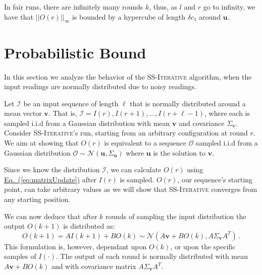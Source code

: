 \documentclass[preprint,12pt]{elsarticle}
\newcommand{\namedrefeq}[2]{\hyperref[#2]{#1~\mbox{\rm(\ref*{#2})}}}
\newcommand{\equationref}[1]{\namedrefeq{Eq.}{#1}}
\newcommand\normi[1]{\left|\left|#1\right|\right|_\infty}
\newcommand{\syncAlg}{\textsc{SS-Iterative}\xspace}
\newcommand{\uu}{\mathbf{u}}
\newcommand{\vv}{\mathbf{v}}
\newcommand{\Ir}[1]{I(#1)}
\newcommand{\Or}[1]{O(#1)}
\begin{document}
In fair runs,
there are infinitely many rounds $k$, thus, as $l$ and $r$ go to
infinity, we have that $\normi{\Or{r}}$ is bounded by a hypercube of
length $\delta  c_1$ around $\uu$.



\section{Probabilistic Bound}\label{sec:Probabilistic}
In this section we analyze the behavior of the \syncAlg algorithm, when the input readings are normally distributed
due to noisy readings. 

Let $\mathcal{I}$ be an input sequence of length $\ell$ that is normally distributed around a mean vector $\vv$. That is, $\mathcal{I} =\Ir{r}, \Ir{r+1}, \dots, \Ir{r+\ell-1}$, where each is sampled i.i.d from a Gaussian distribution with mean $\vv$ and covariance $\Sigma_{\vv}$. Consider \syncAlg's run, starting from an arbitrary configuration at round $r$. We aim at showing that $\Or{r}$ is equivalent to a sequence $\mathcal{O}$ sampled i.i.d from a Gaussian distribution $\mathcal{O} \sim \mathcal{N}(\uu, \Sigma_{\uu})$ where $\uu$ is the solution to $\vv$.

Since we know the distribution $\mathcal{I}$, we can calculate $\Or{r}$ using \equationref{eq:matrixUpdate} after $\Ir{r}$ is sampled. $\Or{r}$, our sequence's starting point, can take arbitrary values as we will show that \syncAlg  converges from any starting position. 

We can now deduce that after $k$ rounds of sampling the input distribution the output $\Or{k+1}$ is distributed as:
\begin{equation}\label{eq:perround}
  \Or{k+1} =
  A\Ir{k+1}+B \Or{k} \sim \mathcal{N}(A \vv+B \Or{k}, A \Sigma_{\vv} A^T)\,.
\end{equation}
This formulation is, however, dependant upon $\Or{k}$, or upon the specific samples of $\Ir{\cdot}$. The output of each round is normally distributed with mean $A \vv+B \Or{k}$ and with covariance matrix $A \Sigma_{\vv}A^T$.
\end{document}
